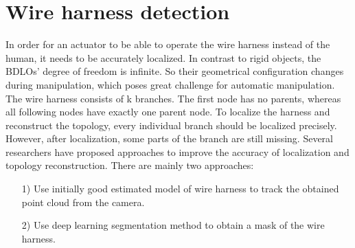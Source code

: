 \section{Wire harness detection}
    In order for an actuator to be able to operate the wire harness instead of the human, it needs to be accurately localized. In contrast to rigid objects, the BDLOs' degree 
    of freedom is infinite. So their geometrical configuration changes during manipulation, which poses great challenge for automatic manipulation\cite{9665147}. 
    The wire harness consists of k branches. The first node has no parents, whereas all 
    following nodes have exactly one parent node\cite{10161483}. To localize the harness and reconstruct the topology, every individual branch should be localized precisely. 
    However, after localization, some parts of the branch are still missing. Several researchers have proposed approaches to improve the accuracy of localization and topology reconstruction. 
    There are mainly two approaches: 
    \begin{itemize}
        \item [1)] Use initially good estimated model of wire harness to track the obtained point cloud from the camera.
        \item [2)] Use deep learning segmentation method to obtain a mask of the wire harness.
    \end{itemize}

